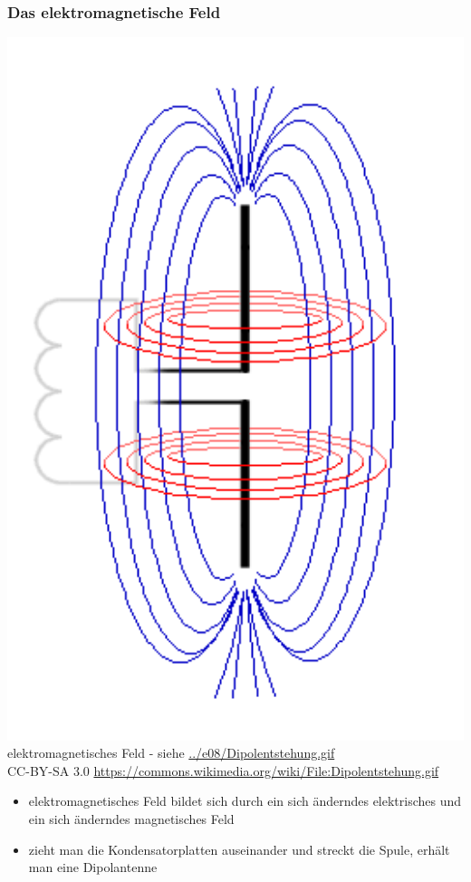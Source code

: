 \begin{frame}
  \frametitle{Das elektromagnetische Feld}
  \begin{center}
    \includegraphics[width=1\textwidth,height=.5\textheight,keepaspectratio]{e08/Dipolentstehung-11.png}\\
    {\tiny elektromagnetisches Feld - siehe \url{../e08/Dipolentstehung.gif} \\
    {\tiny CC-BY-SA 3.0 \url{https://commons.wikimedia.org/wiki/File:Dipolentstehung.gif}}}
  \end{center}
  \begin{itemize}
    \item elektromagnetisches Feld bildet sich durch ein sich änderndes elektrisches und ein sich änderndes magnetisches Feld
    \item zieht man die Kondensatorplatten auseinander und streckt die Spule, erhält man eine Dipolantenne
  \end{itemize}
\end{frame}

